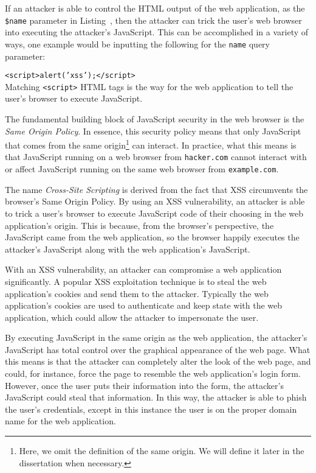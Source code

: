 If an attacker is able to control the HTML output of the web
application, as the \texttt{\$name} parameter in
Listing~, then the attacker can trick the user's
web browser into executing the attacker's JavaScript. This can be
accomplished in a variety of ways, one example would be inputting the
following for the \texttt{name} query parameter:

\noindent\texttt{<script>alert('xss');</script>}
\\

Matching \texttt{<script>} HTML tags is the way for the web
application to tell the user's browser to execute JavaScript.

The fundamental building block of JavaScript security in the web
browser is the \emph{Same Origin Policy}. In essence, this security
policy means that only JavaScript that comes from the same
origin\footnote{Here, we omit the definition of the same origin. We
  will define it later in the dissertation when necessary.} can
interact. In practice, what this means is that JavaScript running on a
web browser from \texttt{hacker.com} cannot interact with or affect
JavaScript running on the same web browser from \texttt{example.com}.

The name \emph{Cross-Site Scripting} is derived from the fact that XSS
circumvents the browser's Same Origin Policy. By using an XSS
vulnerability, an attacker is able to trick a user's browser to
execute JavaScript code of their choosing in the web application's
origin. This is because, from the browser's perspective, the
JavaScript came from the web application, so the browser happily
executes the attacker's JavaScript along with the web application's
JavaScript.

With an XSS vulnerability, an attacker can compromise a web
application significantly. A popular XSS exploitation technique is to
steal the web application's cookies and send them to the attacker.
Typically the web application's cookies are used to authenticate and
keep state with the web application, which could allow the attacker to
impersonate the user.

By executing JavaScript in the same origin as the web application, the
attacker's JavaScript has total control over the graphical appearance
of the web page. What this means is that the attacker can completely
alter the look of the web page, and could, for instance, force the
page to resemble the web application's login form. However, once the
user puts their information into the form, the attacker's JavaScript
could steal that information. In this way, the attacker is able to
phish the user's credentials, except in this instance the user is on
the proper domain name for the web application.

